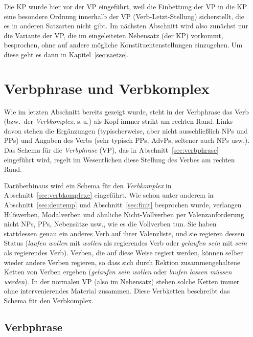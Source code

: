 Die KP wurde hier vor der VP eingeführt, weil die Einbettung der VP in die KP eine besondere Ordnung innerhalb der VP (Verb-Letzt-Stellung) sicherstellt, die es in anderen Satzarten nicht gibt.
Im nächsten Abschnitt wird also zunächst nur die Variante der VP, die im eingeleiteten Nebensatz (der KP) vorkommt, besprochen, ohne auf andere mögliche Konstituentenstellungen einzugehen.
Um diese geht es dann in Kapitel~\ref{sec:saetze}.




\section{Verbphrase und Verbkomplex}

\label{sec:vgr}

Wie im letzten Abschnitt bereits gezeigt wurde, steht in der Verbphrase das Verb (bzw.\ der \textit{Verbkomplex}, s.\,u.) als Kopf immer strikt am rechten Rand.
Links davon stehen die Ergänzungen (typischerweise, aber nicht ausschließlich NPs und PPs) und Angaben des Verbs (sehr typisch \zB PPs, AdvPs, seltener auch NPs usw.).
Das Schema für die \textit{Verbphrase} (VP), das in Abschnitt~\ref{sec:verbphrase} eingeführt wird, regelt im Wesentlichen diese Stellung des Verbes am rechten Rand.

Darüberhinaus wird ein Schema für den \textit{Verbkomplex} in Abschnitt~\ref{sec:verbkomplexe} eingeführt.
Wie schon unter anderem in Abschnitt~\ref{sec:deutemp} und Abschnitt~\ref{sec:finit} besprochen wurde, verlangen Hilfsverben, Modalverben und ähnliche Nicht-Vollverben per Valenzanforderung nicht NPs, PPs, Nebensätze usw., wie es die Vollverben tun.
Sie haben stattdessen genau ein anderes Verb auf ihrer Valenzliste, und sie regieren dessen Status (\zB \textit{laufen wollen} mit \textit{wollen} als regierendes Verb oder \textit{gelaufen sein} mit \textit{sein} als regierendes Verb).
Verben, die auf diese Weise regiert werden, können selber wieder andere Verben regieren, so dass sich durch Rektion zusammengehaltene Ketten von Verben ergeben (\zB \textit{gelaufen sein wollen} oder \textit{laufen lassen müssen werden}).
In der normalen VP (also im Nebensatz) stehen solche Ketten immer ohne intervenierendes Material zusammen.
Diese Verbketten beschreibt das Schema für den Verbkomplex.

\subsection{Verbphrase}

